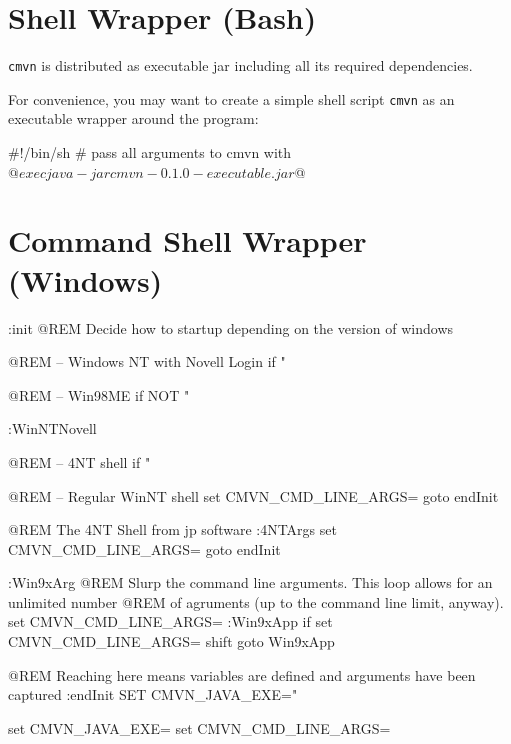\documentclass[a4paper,11pt,english,oneside,halfparskip]{scrartcl}
\newcommand{\cmvn}{\texttt{cmvn}}
\newcommand{\code}[1]{\texttt{#1}}
\begin{document}
\clearpage
\appendix

\section{Shell Wrapper (Bash)}

\cmvn{} is distributed as executable jar including all its required dependencies. 

For convenience, you may want to create a simple shell script \code{cmvn} as an executable wrapper around the program:

\begin{Cmdline}[caption={Shell wrapper: \code{mvu}}]
#!/bin/sh
# pass all arguments to cmvn with $@
exec java -jar cmvn-0.1.0-executable.jar $@
\end{Cmdline}

\section{Command Shell Wrapper (Windows)}

\begin{Cmdline}[caption={Windows Command Shell wrapper: \code{cmvn.bat}}]
:init
@REM Decide how to startup depending on the version of windows

@REM -- Windows NT with Novell Login
if "%

@REM -- Win98ME
if NOT "%

:WinNTNovell

@REM -- 4NT shell
if "%

@REM -- Regular WinNT shell
set CMVN_CMD_LINE_ARGS=%
goto endInit

@REM The 4NT Shell from jp software
:4NTArgs
set CMVN_CMD_LINE_ARGS=%
goto endInit

:Win9xArg
@REM Slurp the command line arguments.  This loop allows for an unlimited number
@REM of agruments (up to the command line limit, anyway).
set CMVN_CMD_LINE_ARGS=
:Win9xApp
if %
set CMVN_CMD_LINE_ARGS=%
shift
goto Win9xApp

@REM Reaching here means variables are defined and arguments have been captured
:endInit
SET CMVN_JAVA_EXE="%


set CMVN_JAVA_EXE=
set CMVN_CMD_LINE_ARGS=
\end{Cmdline}
\end{document}

